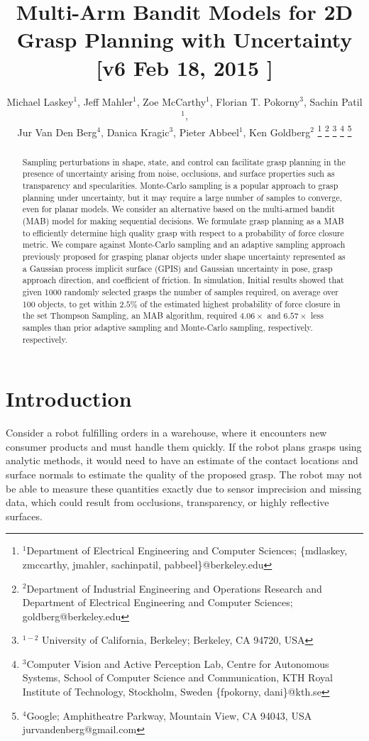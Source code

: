 \documentclass[a4paper, 10pt, conference]{ieeeconf}      %
\title{\LARGE \bf
Multi-Arm Bandit Models for 2D Grasp Planning with Uncertainty  [v6 Feb 18, 2015 ] }
\author{Michael Laskey$^1$, Jeff Mahler$^1$, Zoe McCarthy$^1$,  Florian T. Pokorny$^3$, Sachin Patil$^1$,\\ Jur Van Den Berg$^4$,  Danica Kragic$^3$, Pieter Abbeel$^1$, Ken Goldberg$^2$%
\thanks{$^1$Department of Electrical Engineering and Computer Sciences; {\small \{mdlaskey, zmccarthy, jmahler, sachinpatil, pabbeel\}@berkeley.edu}}%
\thanks{$^2$Department of Industrial Engineering and Operations Research and Department of Electrical Engineering and Computer Sciences; {\small goldberg@berkeley.edu}}%
\thanks{$^{1-2}$ University of California, Berkeley;  Berkeley, CA 94720, USA}%
\thanks{$^3$Computer Vision and Active Perception Lab, Centre for Autonomous Systems, School of Computer Science and Communication, KTH Royal Institute of Technology, Stockholm, Sweden {\small \{fpokorny, dani\}@kth.se}}%
\thanks{$^4$Google; Amphitheatre Parkway, Mountain View, CA 94043, USA {\small jurvandenberg@gmail.com}}%
}
\begin{document}
\maketitle
\thispagestyle{empty}
\pagestyle{empty}



\begin{abstract}
Sampling perturbations in shape, state, and control can facilitate grasp planning in the presence of uncertainty arising from noise, occlusions, and surface properties such as transparency and specularities. 
Monte-Carlo sampling is a popular approach to grasp planning under uncertainty, but it may require a large number of samples to converge, even for planar models.
We consider an alternative based on the multi-armed bandit (MAB) model for making sequential decisions.
We formulate grasp planning as a MAB  to efficiently determine high quality grasp with respect to a probability of force closure metric.
We compare against Monte-Carlo sampling and an adaptive sampling approach previously proposed for grasping planar objects under shape uncertainty represented as a Gaussian process implicit surface (GPIS) and Gaussian uncertainty in pose, grasp approach direction, and coefficient of friction.
In simulation, Initial results  showed that given 1000 randomly selected grasps the number of samples required, on average over 100 objects, to get within $2.5\%$ of the estimated highest probability of force closure in the set Thompson Sampling, an MAB algorithm, required $4.06\times$ and $6.57\times$ less samples than prior adaptive sampling and Monte-Carlo sampling, respectively.  respectively. 
\end{abstract}



\section{Introduction}



Consider a robot fulfilling orders in a warehouse, where it encounters new consumer products and must handle them quickly. If the robot plans grasps using analytic methods, it would need to have an estimate of the contact locations and surface normals to estimate the quality of the proposed grasp. The robot may not be able to measure these quantities exactly due to sensor imprecision and missing data, which could result from occlusions, transparency, or highly reflective surfaces.
\end{document}
